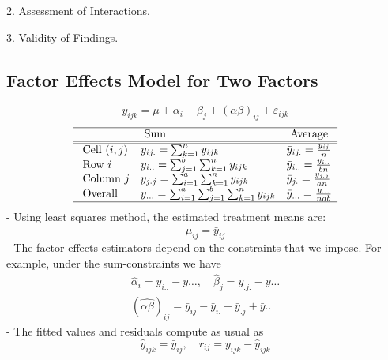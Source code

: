 \documentclass[11pt,a4paper]{article}
\begin{document}
2. Assessment of Interactions.

3. Validity of Findings.

\subsection{Factor Eﬀects Model for Two Factors}
$$y_{ijk}=\mu+\alpha_i+\beta_j+(\alpha\beta)_{ij}+\varepsilon_{ijk}$$
\begin{equation}
    \begin{array}{lll}
    \hline & \text { Sum } & \text { Average } \\
    \hline \hline \text { Cell }(i, j) & y_{i j .}=\sum_{k=1}^{n} y_{i j k} & \bar{y}_{i j .}=\frac{y_{i j}}{n} \\
    \text { Row } i & y_{i . .}=\sum_{j=1}^{b} \sum_{k=1}^{n} y_{i j k} & \bar{y}_{i . .}=\frac{y_{i . .}}{b n} \\
    \text { Column } j & y_{j . j}=\sum_{i=1}^{a} \sum_{k=1}^{n} y_{i j k} & \bar{y}_{j .}=\frac{y_{j . j}}{a n} \\
    \text { Overall } & y_{...}=\sum_{i=1}^{a} \sum_{j=1}^{b} \sum_{k=1}^{n} y_{i j k} & \bar{y}_{...}=\frac{y_{...}}{n a b} \\
    \hline
    \end{array}
    \nonumber
\end{equation}
- Using least squares method, the estimated treatment means are:
$$
\hat{\mu}_{i j}=\bar{y}_{i j}
$$
- The factor effects estimators depend on the constraints that we impose. For example, under the sum-constraints we have
$$
\begin{gathered}
\hat{\alpha}_{i}=\bar{y}_{i . .}-\bar{y} \ldots, \quad \hat{\beta}_{j}=\bar{y}_{. j .}-\bar{y} \ldots \\
(\hat{\alpha \beta})_{i j}=\bar{y}_{i j}-\bar{y}_{i .}-\bar{y}_{. j}+\bar{y} . .
\end{gathered}
$$
- The fitted values and residuals compute as usual as
$$
\hat{y}_{i j k}=\bar{y}_{i j}, \quad r_{i j}=y_{i j k}-\hat{y}_{i j k}
$$
\end{document}
